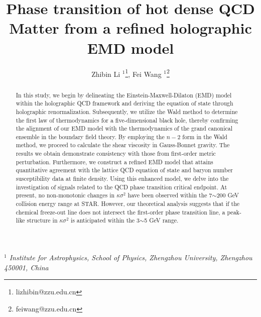 \documentclass[a4paper,12pt]{article}
\numberwithin{equation}{section}
\begin{document}
	
	\title{\textbf{Phase transition of hot dense QCD Matter from a refined holographic EMD model}}
	\author{Zhibin Li $^{1}$\footnote{lizhibin@zzu.edu.cn},
                Fei Wang $^{1}$\footnote{feiwang@zzu.edu.cn}}
	\date{}
	\maketitle
	
	\vspace{-10mm}
	
	\begin{center}
		{\it
			$^{1}$ Institute for Astrophysics, School of Physics, Zhengzhou University, Zhengzhou 450001, China\\ \vspace{1mm}	
		}
		\vspace{10mm}
	\end{center}
	
	
	\begin{abstract}
In this study, we begin by delineating the Einstein-Maxwell-Dilaton (EMD) model within the holographic QCD framework and deriving the equation of state through holographic renormalization. Subsequently, we utilize the Wald method to determine the first law of thermodynamics for a five-dimensional black hole, thereby confirming the alignment of our EMD model with the thermodynamics of the grand canonical ensemble in the boundary field theory. By employing the $n-2$ form in the Wald method, we proceed to calculate the shear viscosity in Gauss-Bonnet gravity. The results we obtain demonstrate consistency with those from first-order metric perturbation. Furthermore, we construct a refined EMD model that attains quantitative agreement with the lattice QCD equation of state and baryon number susceptibility data at finite density. Using this enhanced model, we delve into the investigation of signals related to the QCD phase transition critical endpoint. At present, no non-monotonic changes in $\kappa\sigma^2$ have been observed within the 7$\sim$200 GeV collision energy range at STAR. However, our theoretical analysis suggests that if the chemical freeze-out line does not intersect the first-order phase transition line, a peak-like structure in $\kappa\sigma^2$ is anticipated within the 3$\sim$5 GeV range.
	\end{abstract}
	
	\baselineskip 18pt
	\thispagestyle{empty}
	\newpage
	
	\tableofcontents
	
	\maketitle
\end{document}
